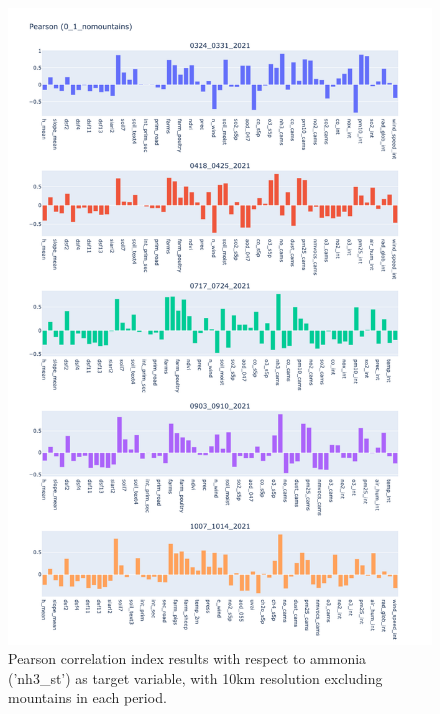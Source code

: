 \begin{figure}[H]
    \centering
    \includegraphics[scale=0.38]{images/tests/0_1_nomountainsnh3_st_pearson.png}
    \caption{Pearson correlation index results with respect to ammonia ('nh3\_st') as target variable, with 10km resolution excluding mountains in each period.}
    
\end{figure}
